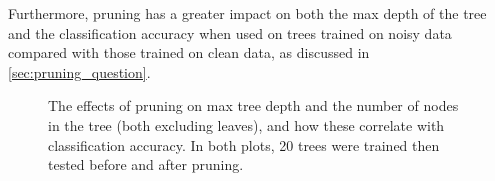 \documentclass[11pt,twoside]{article}
\begin{document}
\noindent Furthermore, pruning has a greater impact on both the max depth of the tree and the classification accuracy when used on trees trained on noisy data compared with those trained on clean data, as discussed in \autoref{sec:pruning_question}.

\begin{figure}
\caption[Effects of Pruning on Depth and Sparseness]{The effects of pruning on max tree depth and the number of nodes in the tree (both excluding leaves), and how these correlate with classification accuracy. In both plots, 20 trees were trained then tested before and after pruning.}
\label{fig:pruning_effect_overview}
\end{figure}
\end{document}
